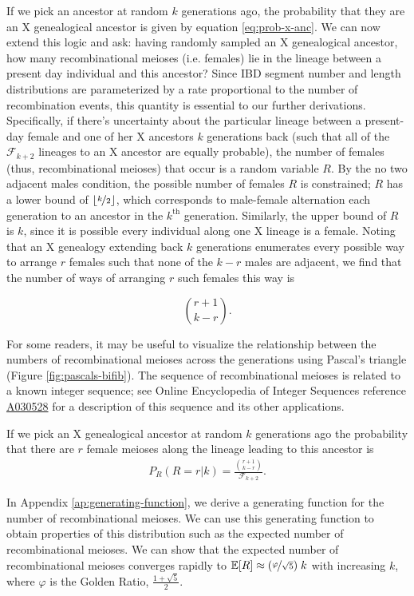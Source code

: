 \documentclass[9pt,twocolumn,twoside]{gsajnl}
\newcommand{\E}{\mathbb{E}}
\begin{document}
If we pick an ancestor at random $k$ generations ago, the probability that they
are an X genealogical ancestor is given by equation \eqref{eq:prob-x-anc}. We
can now extend this logic and ask: having randomly sampled an X genealogical
ancestor, how many recombinational meioses (i.e. females) lie in the lineage
between a present day individual and this ancestor? Since IBD segment number
and length distributions are parameterized by a rate proportional to the number
of recombination events, this quantity is essential to our further derivations.
Specifically, if there's uncertainty about the particular lineage between a
present-day female and one of her X ancestors $k$ generations back (such that
all of the $\mathcal{F}_{k+2}$ lineages to an X ancestor are equally probable),
the number of females (thus, recombinational meioses) that occur is a random
variable $R$. By the no two adjacent males condition, the possible number of
females $R$ is constrained; $R$ has a lower bound of $\lfloor \nicefrac{k}{2}
\rfloor$, which corresponds to male-female alternation each generation to an
ancestor in the $k^\text{th}$ generation. Similarly, the upper bound of $R$ is
$k$, since it is possible every individual along one X lineage is a female.
Noting that an X genealogy extending back $k$ generations enumerates every
possible way to arrange $r$ females such that none of the $k-r$ males are
adjacent, we find that the number of ways of arranging $r$ such females this
way is

\begin{equation}
{ r + 1 \choose k - r}.
\end{equation}

For some readers, it may be useful to visualize the relationship between the
numbers of recombinational meioses across the generations using Pascal's
triangle (Figure \ref{fig:pascals-bifib}). The sequence of recombinational
meioses is related to a known integer sequence; see Online Encyclopedia of
Integer Sequences reference \href{https://oeis.org/A030528}{A030528}
\citep{sloane2014online} for a description of this sequence and its other
applications.

If we pick an X genealogical ancestor at random $k$ generations ago the
probability that there are $r$ female meioses along the lineage leading to this
ancestor is
\begin{align}
  \label{eq:recomb-pmf}
  P_R(R = r | k) = \frac{{r + 1 \choose k - r}}{\mathcal{F}_{k+2}}.
\end{align}

In Appendix \ref{ap:generating-function}, we derive a generating function for
the number of recombinational meioses. We can use this generating function to
obtain properties of this distribution such as the expected number of
recombinational meioses. We can show that the expected number of
recombinational meioses converges rapidly to $\E[R] \approx
(\nicefrac{\varphi}{\sqrt{5}}) \; k$ with increasing $k$, where $\varphi$ is
the Golden Ratio, $\frac{1 + \sqrt{5}}{2}$.
\end{document}
